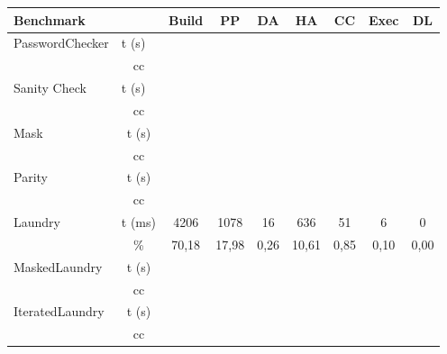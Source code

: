 \begin{center}
    \begin{table}[]
        \begin{tabular}{|l|c|c|c|c|c|c|c|c|}
        \hline
        \textbf{Benchmark}               & \multicolumn{1}{l|}{}      & Build & PP & DA & HA & CC & Exec & DL \\ \hline
        \multirow{2}{*}{PasswordChecker} & \multicolumn{1}{l|}{t (s)} &       &    &    &    &    &      &    \\ \cline{2-9} 
                                         & cc                         &       &    &    &    &    &      &    \\ \hline
        \multirow{2}{*}{Sanity Check}    & \multicolumn{1}{l|}{t (s)} &       &    &    &    &    &      &    \\ \cline{2-9} 
                                         & cc                         &       &    &    &    &    &      &    \\ \hline
        \multirow{2}{*}{Mask}            & t (s)                      &       &    &    &    &    &      &    \\ \cline{2-9} 
                                         & cc                         &       &    &    &    &    &      &    \\ \hline
        \multirow{2}{*}{Parity}          & t (s)                      &       &    &    &    &    &      &    \\ \cline{2-9} 
                                         & cc                         &       &    &    &    &    &      &    \\ \hline
        \multirow{2}{*}{Laundry}         & t (ms)                      &  4206     &  1078  &  16  &  636  &  51  &  6    &  0  \\ \cline{2-9} 
                                         & \%                         &    70,18   &  17,98  &  0,26  &  10,61  &  0,85  &  0,10    &  0,00  \\ \hline
        \multirow{2}{*}{MaskedLaundry}   & t (s)                      &       &    &    &    &    &      &    \\ \cline{2-9} 
                                         & cc                         &       &    &    &    &    &      &    \\ \hline
        \multirow{2}{*}{IteratedLaundry} & t (s)                      &       &    &    &    &    &      &    \\ \cline{2-9} 
                                         & cc                         &       &    &    &    &    &      &    \\ \hline

\end{tabular}
\end{table}
\end{center}
